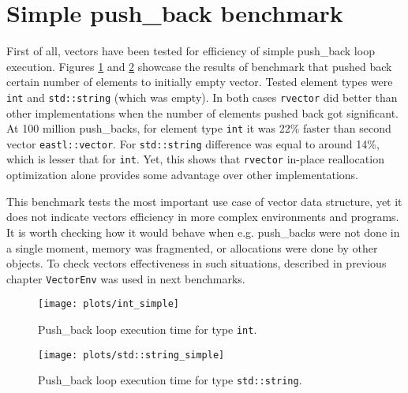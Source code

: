 \documentclass[inz, english, shortabstract]{iithesis}
\begin{document}
\section {Simple push\_back benchmark}

First of all, vectors have been tested for efficiency of simple push\_back loop execution. Figures \ref{int_simple} and \ref{string_simple} showcase the results of benchmark that pushed back certain number of elements to initially empty vector. Tested element types were {\tt int} and {\tt std::string} (which was empty). In both cases {\tt rvector} did better than other implementations when the number of elements pushed back got significant. At 100 million push\_backs, for element type {\tt int} it was 22\% faster than second vector {\tt eastl::vector}. For {\tt std::string} difference was equal to around 14\%, which is lesser that for {\tt int}. Yet, this shows that {\tt rvector} in-place reallocation optimization alone provides some advantage over other implementations.

This benchmark tests the most important use case of vector data structure, yet it does not indicate vectors efficiency in more complex environments and programs. It is worth checking how it would behave when e.g. push\_backs were not done in a single moment, memory was fragmented, or allocations were done by other objects. To check vectors effectiveness in such situations, described in previous chapter {\tt VectorEnv} was used in next benchmarks.

\begin{figure}[h!]
\texttt{[image: plots/int\_simple]}
\caption{Push\_back loop execution time for type {\tt int}.}
\label{int_simple}
\end{figure}

\begin{figure}[h!]
\texttt{[image: plots/std::string\_simple]}
\caption{Push\_back loop execution time for type {\tt std::string}.}
\label{string_simple}
\end{figure}

\clearpage
\end{document}
